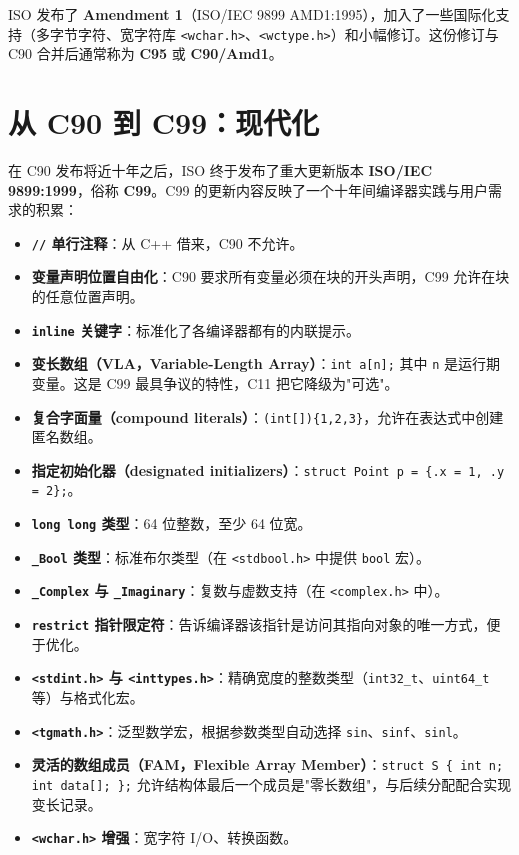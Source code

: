 \documentclass[12pt,a4paper,fontset=fandol]{ctexbook}
\newcommand{\yearlabel}[1]{%
  \tcbox[on line,colback=yearheadbg,colframe=yearheadbg,
    boxrule=0pt,arc=1pt,left=3pt,right=3pt,top=1pt,bottom=1pt,
    colupper=white,fontupper=\scriptsize\bfseries]{#1}}
\newcommand{\kw}[1]{\texttt{#1}}
\newcommand{\yrlbl}[1]{\yearlabel{#1}}
\begin{document}
\yrlbl{1994-1996} ISO 发布了 \textbf{Amendment 1}（ISO/IEC 9899 AMD1:1995），加入了一些国际化支持（多字节字符、宽字符库 \texttt{<wchar.h>}、\texttt{<wctype.h>}）和小幅修订。这份修订与 C90 合并后通常称为 \textbf{C95} 或 \textbf{C90/Amd1}。

\section{从 C90 到 C99：现代化}

\yrlbl{1999} 在 C90 发布将近十年之后，ISO 终于发布了重大更新版本 \textbf{ISO/IEC 9899:1999}，俗称 \textbf{C99}。C99 的更新内容反映了一个十年间编译器实践与用户需求的积累：

\begin{itemize}
  \item \textbf{\kw{//} 单行注释}：从 C++ 借来，C90 不允许。
  \item \textbf{变量声明位置自由化}：C90 要求所有变量必须在块的开头声明，C99 允许在块的任意位置声明。
  \item \textbf{\kw{inline} 关键字}：标准化了各编译器都有的内联提示。
  \item \textbf{变长数组（VLA，Variable-Length Array）}：\kw{int a[n];} 其中 \kw{n} 是运行期变量。这是 C99 最具争议的特性，C11 把它降级为"可选"。
  \item \textbf{复合字面量（compound literals）}：\kw{(int[])\{1,2,3\}}，允许在表达式中创建匿名数组。
  \item \textbf{指定初始化器（designated initializers）}：\kw{struct Point p = \{.x = 1, .y = 2\};}。
  \item \textbf{\kw{long long} 类型}：64 位整数，至少 64 位宽。
  \item \textbf{\kw{\_Bool} 类型}：标准布尔类型（在 \texttt{<stdbool.h>} 中提供 \kw{bool} 宏）。
  \item \textbf{\kw{\_Complex} 与 \kw{\_Imaginary}}：复数与虚数支持（在 \texttt{<complex.h>} 中）。
  \item \textbf{\kw{restrict} 指针限定符}：告诉编译器该指针是访问其指向对象的唯一方式，便于优化。
  \item \textbf{\kw{<stdint.h>} 与 \kw{<inttypes.h>}}：精确宽度的整数类型（\kw{int32\_t}、\kw{uint64\_t} 等）与格式化宏。
  \item \textbf{\kw{<tgmath.h>}}：泛型数学宏，根据参数类型自动选择 \kw{sin}、\kw{sinf}、\kw{sinl}。
  \item \textbf{灵活的数组成员（FAM，Flexible Array Member）}：\kw{struct S \{ int n; int data[]; \};} 允许结构体最后一个成员是"零长数组"，与后续分配配合实现变长记录。
  \item \textbf{\kw{<wchar.h>} 增强}：宽字符 I/O、转换函数。
\end{itemize}
\end{document}
